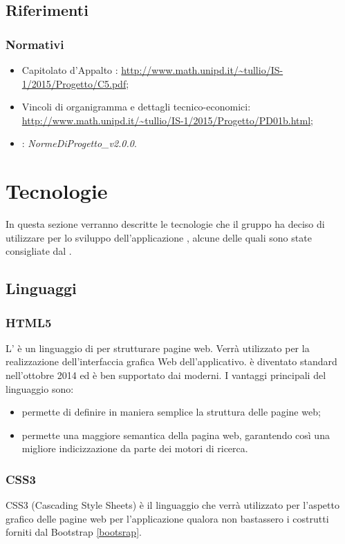 \documentclass[12pt,a4paper]{article}
\begin{document}
\subsection{Riferimenti}\label{riferimenti}
\subsubsection{Normativi}
\begin{itemize}
	\item Capitolato d’Appalto \prjL: \url{http://www.math.unipd.it/~tullio/IS-1/2015/Progetto/C5.pdf};
	\item Vincoli di organigramma e dettagli tecnico-economici: \url{http://www.math.unipd.it/~tullio/IS-1/2015/Progetto/PD01b.html};
	\item \NdP: \textit{NormeDiProgetto\_v2.0.0}. 
\end{itemize}

\newpage

\section{Tecnologie}\label{tecnologie}
In questa sezione verranno descritte le tecnologie che il gruppo ha deciso di utilizzare per lo sviluppo dell'applicazione \prjL{}, alcune delle quali sono state consigliate dal .


\subsection{Linguaggi}
\subsubsection{HTML5}\label{html}
L’ è un linguaggio di  per strutturare pagine web. Verrà utilizzato per la realizzazione dell’interfaccia grafica Web dell’applicativo.  è diventato standard  nell’ottobre 2014 ed è ben supportato dai  moderni.
I vantaggi principali del linguaggio sono:
\begin{itemize}
	\item permette di definire in maniera semplice la struttura delle pagine web;
	\item permette una maggiore semantica della pagina web, garantendo così una migliore indicizzazione da parte dei motori di ricerca.
\end{itemize}

\subsubsection{CSS3}\label{css}
CSS3 (Cascading Style Sheets) è il linguaggio che verrà utilizzato per l’aspetto grafico delle pagine web per l'applicazione qualora non bastassero i costrutti forniti dal
 Bootstrap \ref{bootsrap}.
\end{document}
